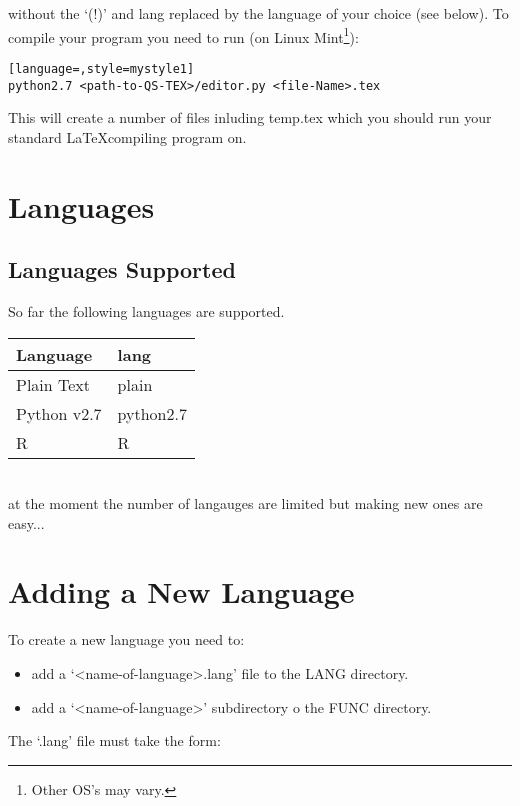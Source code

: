 \documentclass[a4paper,12pt,twocolum]{article}
\begin{document}
without the `(!)' and lang replaced by the language of your choice (see below). To compile your program you need to run (on Linux Mint\footnote{Other OS's may vary.}):


\begin{lstlisting}[language=,style=mystyle1]
python2.7 <path-to-QS-TEX>/editor.py <file-Name>.tex
\end{lstlisting}
          
This will create a number of files inluding temp.tex which you should run your standard \LaTeX compiling program on.
\section{Languages}
\subsection{Languages Supported}
So far the following languages are supported.\\
\begin{tabular}{|p{1.5in}|p{1.5in}|}
\hline 
\textbf{Language} & \textbf{lang}\\
\hline
Plain Text & plain\\ \hline
Python v2.7 & python2.7\\ \hline
R & R\\ \hline
\end{tabular}
\\
at the moment the number of langauges are limited but making new ones are easy...
\section{Adding a New Language}
To create a new language you need to:
\begin{itemize}
\item add a `<name-of-language>.lang' file to the LANG directory.
\item add a `<name-of-language>' subdirectory o the FUNC directory.
\end{itemize}
The `.lang' file must take the form:
\end{document}
